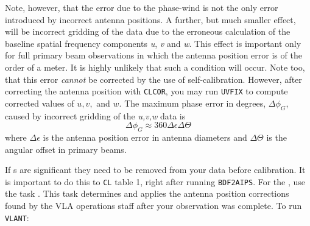     Note, however, that the error due to the phase-wind is not the
only error introduced by incorrect antenna positions.  A further, but
much smaller effect, will be incorrect gridding of the data due to the
erroneous calculation of the baseline spatial frequency components
{\it u\/}, {\it v\/} and {\it w\/}.  This effect is important only for
full primary beam observations in which the antenna position error is
of the order of a meter.  It is highly unlikely that such a condition
will occur.  Note too, that this error {\it cannot\/} be corrected by
the use of self-calibration.  However, after correcting the antenna
position with {\tt CLCOR}, you may run {\tt UVFIX} to compute
corrected values of $u, v,$ and $w$.  The maximum phase error in
degrees, $\Delta\phi_{G}$, caused by incorrect gridding of the {\it
u,v,w\/} data is
       $$\Delta\phi_{G} \approx 360 \Delta\epsilon \Delta\Theta$$
where $\Delta\epsilon$ is the antenna position error in antenna
diameters and $\Delta\Theta$ is the angular offset in primary beams.

If s are significant they need to be removed from
your data before calibration.  It is important to do this to {\tt CL}
table 1, right after running {\tt BDF2AIPS}.  For the , use
the task {\tt {}}\@.  This task determines and applies the
antenna position corrections found by the VLA operations staff after
your observation was complete.  To run {\tt VLANT}:

